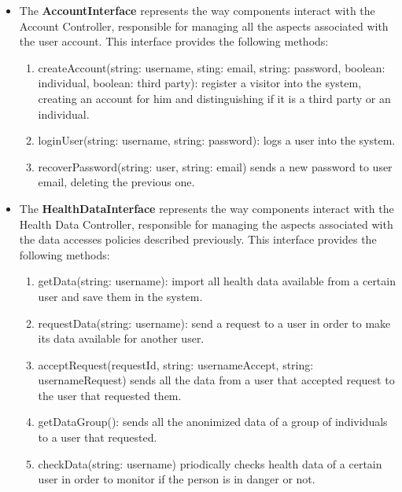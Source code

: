 \documentclass[12pt]{article}
\begin{document}
\begin{itemize}
    \item The \textbf{AccountInterface} represents the way components interact with the Account Controller, responsible for managing all the aspects associated with the user account. This interface provides the following methods: 
    \begin{enumerate}
        \item createAccount(string: username, sting: email, string: password, boolean: individual, boolean: third party): register a visitor into the system, creating an account for him and distinguishing if it is a third party or an individual. 
        \item loginUser(string: username, string: password): logs a user into the system. 
        \item recoverPassword(string: user, string: email) sends a new password to user email, deleting the previous one. 
    \end{enumerate}
    \newpage 
    \item The \textbf{HealthDataInterface} represents the way components interact with the Health Data Controller, responsible for managing the aspects associated with the data accesses policies described previously. This interface provides the following methods: \begin{enumerate}
        \item getData(string: username): import all health data available from a certain user and save them in the system.
        \item requestData(string: username): send a request to a user in order to make its data available for another user. 
        \item acceptRequest(requestId, string: usernameAccept, string: usernameRequest) sends all the data from a user that accepted request to the user that requested them. 
        \item getDataGroup(): sends all the anonimized data of a group of individuals to a user that requested. 
        \item checkData(string: username) priodically checks health data of a certain user in order to monitor if the person is in danger or not.
    \end{enumerate}
    

\end{itemize}
\end{document}
